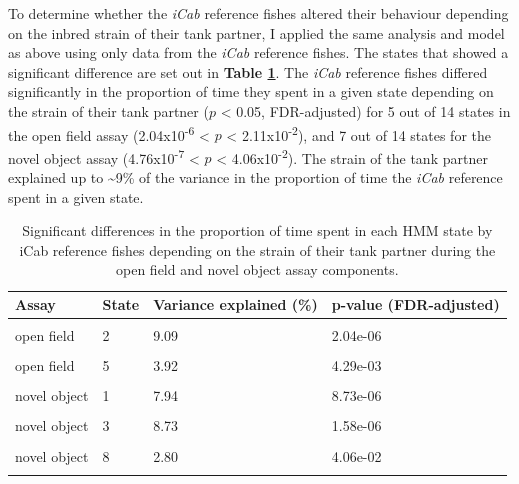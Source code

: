 \documentclass[
]{book}
\begin{document}
To determine whether the \emph{iCab} reference fishes altered their behaviour depending on the inbred strain of their tank partner, I applied the same analysis and model as above using only data from the \emph{iCab} reference fishes. The states that showed a significant difference are set out in \textbf{Table \ref{tab:pilot-sge-tbl}}. The \emph{iCab} reference fishes differed significantly in the proportion of time they spent in a given state depending on the strain of their tank partner (\(p\) \textless{} 0.05, FDR-adjusted) for 5 out of 14 states in the open field assay (2.04x10\textsuperscript{-6} \textless{} \(p\) \textless{} 2.11x10\textsuperscript{-2}), and 7 out of 14 states for the novel object assay (4.76x10\textsuperscript{-7} \textless{} \(p\) \textless{} 4.06x10\textsuperscript{-2}). The strain of the tank partner explained up to \textasciitilde9\% of the variance in the proportion of time the \emph{iCab} reference spent in a given state.

\begin{table}

\caption{\label{tab:pilot-sge-tbl}Significant differences in the proportion of time spent in each HMM state by iCab reference fishes depending on the strain of their tank partner during the open field and novel object assay components.}
\centering
\begin{tabular}[t]{llll}
\toprule
Assay & State & Variance explained (\%) & p-value (FDR-adjusted)\\
\midrule
\cellcolor{gray!6}{open field} & \cellcolor{gray!6}{1} & \cellcolor{gray!6}{8.52} & \cellcolor{gray!6}{5.88e-06}\\
open field & 2 & 9.09 & 2.04e-06\\
\cellcolor{gray!6}{open field} & \cellcolor{gray!6}{3} & \cellcolor{gray!6}{7.97} & \cellcolor{gray!6}{1.77e-05}\\
open field & 5 & 3.92 & 4.29e-03\\
\cellcolor{gray!6}{open field} & \cellcolor{gray!6}{12} & \cellcolor{gray!6}{2.97} & \cellcolor{gray!6}{2.11e-02}\\
\addlinespace
novel object & 1 & 7.94 & 8.73e-06\\
\cellcolor{gray!6}{novel object} & \cellcolor{gray!6}{2} & \cellcolor{gray!6}{9.38} & \cellcolor{gray!6}{4.76e-07}\\
novel object & 3 & 8.73 & 1.58e-06\\
\cellcolor{gray!6}{novel object} & \cellcolor{gray!6}{6} & \cellcolor{gray!6}{4.76} & \cellcolor{gray!6}{1.23e-03}\\
novel object & 8 & 2.80 & 4.06e-02\\
\addlinespace
\cellcolor{gray!6}{novel object} & \cellcolor{gray!6}{10} & \cellcolor{gray!6}{3.81} & \cellcolor{gray!6}{8.43e-03}\\
\bottomrule
\end{tabular}
\end{table}
\end{document}

